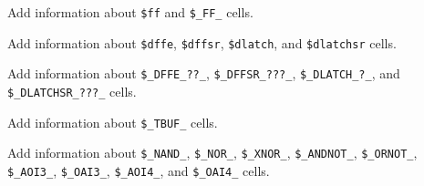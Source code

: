 \begin{fixme}
Add information about {\tt \$ff} and {\tt \$\_FF\_} cells.
\end{fixme}

\begin{fixme}
Add information about {\tt \$dffe}, {\tt \$dffsr}, {\tt \$dlatch}, and {\tt \$dlatchsr} cells.
\end{fixme}

\begin{fixme}
Add information about {\tt \$\_DFFE\_??\_}, {\tt \$\_DFFSR\_???\_}, {\tt \$\_DLATCH\_?\_}, and {\tt \$\_DLATCHSR\_???\_} cells.
\end{fixme}

\begin{fixme}
Add information about {\tt \$\_TBUF\_} cells.
\end{fixme}

\begin{fixme}
Add information about {\tt \$\_NAND\_}, {\tt \$\_NOR\_}, {\tt \$\_XNOR\_}, {\tt \$\_ANDNOT\_}, {\tt \$\_ORNOT\_},
{\tt \$\_AOI3\_}, {\tt \$\_OAI3\_}, {\tt \$\_AOI4\_}, and {\tt \$\_OAI4\_} cells.
\end{fixme}

